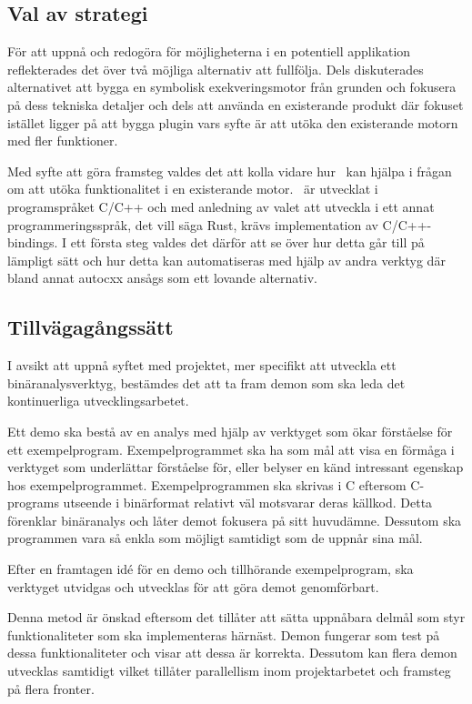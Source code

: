\subsection{Val av strategi}

För att uppnå och redogöra för möjligheterna i en potentiell applikation
reflekterades det över två möjliga alternativ att fullfölja. Dels diskuterades
alternativet att bygga en symbolisk exekveringsmotor från grunden och fokusera
på dess tekniska detaljer och dels att använda en existerande produkt där
fokuset istället ligger på att bygga plugin vars syfte är att utöka den
existerande motorn med fler funktioner.

Med syfte att göra framsteg valdes det att kolla vidare hur \stoe\ kan hjälpa i
frågan om att utöka funktionalitet i en existerande motor. \stoe\ är utvecklat
i programspråket C/C++ och med anledning av valet att utveckla i ett
annat programmeringsspråk, det vill säga Rust, krävs implementation av
C/C++-bindings. I ett första steg valdes det därför att se över hur detta går till
på lämpligt sätt och hur detta kan automatiseras med hjälp av andra verktyg
där bland annat autocxx ansågs som ett lovande alternativ.

\subsection{Tillvägagångssätt}
I avsikt att uppnå syftet med projektet, mer specifikt att utveckla ett
binäranalysverktyg, bestämdes det att ta fram demon som ska leda det
kontinuerliga utvecklingsarbetet.

Ett demo ska bestå av en analys med hjälp av verktyget som ökar förståelse för
ett exempelprogram. Exempelprogrammet ska ha som mål att visa en förmåga i
verktyget som underlättar förståelse för, eller belyser en känd intressant
egenskap hos exempelprogrammet. Exempelprogrammen ska skrivas i C eftersom
C-programs utseende i binärformat relativt väl motsvarar deras källkod. Detta
förenklar binäranalys och låter demot fokusera på sitt huvudämne. Dessutom ska
programmen vara så enkla som möjligt samtidigt som de uppnår sina mål.

Efter en framtagen id\'e för en demo och tillhörande exempelprogram, ska
verktyget utvidgas och utvecklas för att göra demot genomförbart.

Denna metod är önskad eftersom det tillåter att sätta uppnåbara delmål som styr
funktionaliteter som ska implementeras härnäst. Demon fungerar som test på dessa
funktionaliteter och visar att dessa är korrekta. Dessutom kan flera demon
utvecklas samtidigt vilket tillåter parallellism inom projektarbetet och
framsteg på flera fronter.

